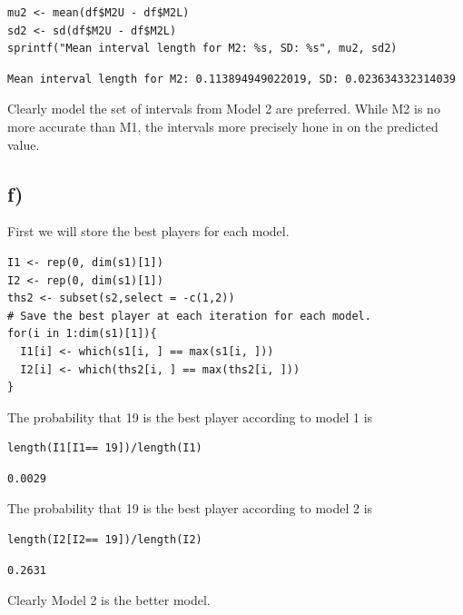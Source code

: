 \documentclass[11pt]{article}
\begin{document}
\begin{verbatim}
mu2 <- mean(df$M2U - df$M2L)
sd2 <- sd(df$M2U - df$M2L)
sprintf("Mean interval length for M2: %s, SD: %s", mu2, sd2)
\end{verbatim}

\begin{verbatim}
Mean interval length for M2: 0.113894949022019, SD: 0.023634332314039
\end{verbatim}

Clearly model the set of intervals from Model 2 are preferred. While M2 is no more accurate than M1, the intervals more precisely hone in on the predicted value.
\subsection*{f)}
\label{sec:org172972d}
First we will store the best players for each model.
\begin{verbatim}
I1 <- rep(0, dim(s1)[1])
I2 <- rep(0, dim(s1)[1])
ths2 <- subset(s2,select = -c(1,2))
# Save the best player at each iteration for each model.
for(i in 1:dim(s1)[1]){
  I1[i] <- which(s1[i, ] == max(s1[i, ]))
  I2[i] <- which(ths2[i, ] == max(ths2[i, ]))
}
\end{verbatim}

The probability that 19 is the best player according to model 1 is
\begin{verbatim}
length(I1[I1== 19])/length(I1)
\end{verbatim}

\begin{verbatim}
0.0029
\end{verbatim}


The probability that 19 is the best player according to model 2 is
\begin{verbatim}
length(I2[I2== 19])/length(I2)
\end{verbatim}

\begin{verbatim}
0.2631
\end{verbatim}

Clearly Model 2 is the better model.
\end{document}
